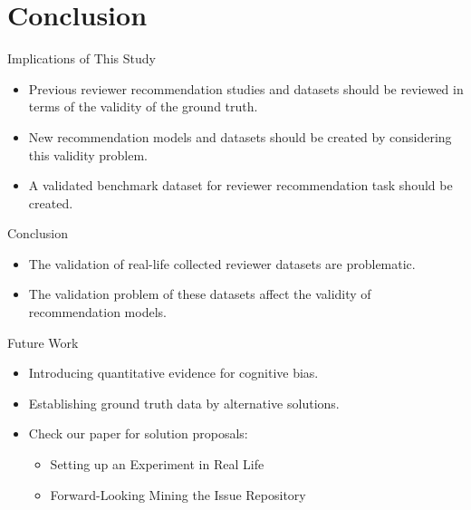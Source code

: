 \documentclass{beamer}
\begin{document}
\section{Conclusion}
\begin{frame}{Implications of This Study}
\begin{itemize}
    \item\large Previous reviewer recommendation studies and datasets should be reviewed in terms of the validity of the ground truth.
    \pause
    \item\large New recommendation models and datasets should be created by considering this validity problem.
    \pause
    \item\large A validated benchmark dataset for reviewer recommendation task should be created.  
\end{itemize}

\end{frame}
\begin{frame}{Conclusion}

\begin{itemize}
    
    \item\large The validation of real-life collected reviewer datasets are problematic.
    \pause
   \item\large The validation problem of these datasets affect the validity of recommendation models.    

\end{itemize}
\end{frame}
\begin{frame}{Future Work}

\begin{itemize}
    \item Introducing quantitative evidence for cognitive bias.
    \pause
    \item Establishing ground truth data by alternative solutions.
    \pause
    \item Check our paper for solution proposals:
    \begin{itemize}
        \item Setting up an Experiment in Real Life
        \item Forward-Looking Mining the Issue Repository
    \end{itemize}
\end{itemize}
\end{frame}
\end{document}
